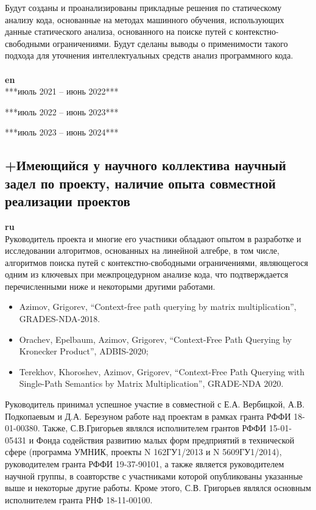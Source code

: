 \documentclass[12pt]{article}  %
\theoremstyle{remark}
\begin{document}
Будут созданы и проанализированы прикладные решения по статическому анализу кода, основанные на методах машинного обучения, использующих данные статического анализа, основанного на поиске путей с контекстно-свободными ограничениями. Будут сделаны выводы о применимости такого подхода для уточнения интеллектуальных средств анализ программного кода.
\\
\\
\textbf{en}\\

***июль 2021 -- июнь 2022***


***июль 2022 -- июнь 2023***


***июль 2023 -- июнь 2024***


\subsection{+Имеющийся у научного коллектива научный задел по проекту, наличие опыта совместной реализации проектов}

\textbf{ru}\\

Руководитель проекта и многие его участники обладают опытом в разработке и исследовании алгоритмов, основанных на линейной алгебре, в том числе, алгоритмов поиска путей с контекстно-свободными ограничениями, являющегося одним из ключевых при межпроцедурном анализе кода, что подтверждается перечисленными ниже и некоторыми другими работами.
\begin{itemize}
  \item Azimov, Grigorev, ``Context-free path querying by matrix multiplication'', GRADES-NDA-2018.
  \item Orachev, Epelbaum, Azimov, Grigorev, ``Context-Free Path Querying by Kronecker Product'', ADBIS-2020;
  \item Terekhov, Khoroshev, Azimov, Grigorev, ``Context-Free Path Querying with Single-Path Semantics by Matrix Multiplication'', GRADE-NDA 2020.
\end{itemize}

Руководитель принимал успешное участие в совместной с Е.А. Вербицкой, А.В. Подкопаевым и Д.А. Березуном работе над проектам в рамках гранта РФФИ 18-01-00380. Также, С.В.Григорьев являлся исполнителем грантов РФФИ 15-01-05431 и Фонда содействия развитию малых форм предприятий в технической сфере (программа УМНИК, проекты N 162ГУ1/2013 и N 5609ГУ1/2014), руководителем гранта РФФИ 19-37-90101, а также является руководителем научной группы, в соавторстве с участниками которой опубликованы указанные выше и некоторые другие работы. Кроме этого, С.В. Григорьев являлся основным исполнителем гранта РНФ 18-11-00100.  
\end{document}
